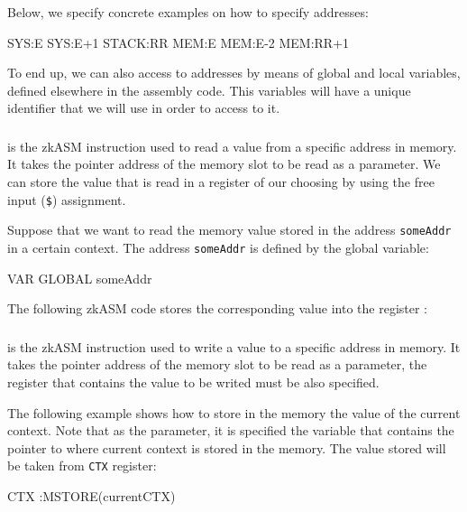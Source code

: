 Below, we specify concrete examples on how to specify addresses:

\begin{zkasm}
SYS:E
SYS:E+1
STACK:RR
MEM:E 
MEM:E-2
MEM:RR+1
\end{zkasm}

To end up, we can also access to addresses by means of global and local variables, defined elsewhere in the assembly code. This variables will have a unique identifier that we will use in order to access to it.


\subsubsection{\MLOAD}


\MLOAD is the zkASM instruction used to read a value from a specific address in memory. It takes the pointer address of the memory slot to be read as a parameter. We can store the value that is read in a register of our choosing by using the free input (\texttt{\$}) assignment. 

Suppose that we want to read the memory value stored in the address \texttt{someAddr} in a certain context. The address \texttt{someAddr} is defined by the global variable:
\begin{zkasm}
VAR GLOBAL someAddr
\end{zkasm}

The following zkASM code stores the corresponding value into the register \A:





\subsubsection{\MSTORE}


\MSTORE is the zkASM instruction used to write a value to a specific address in memory. It takes the pointer address of the memory slot to be read as a parameter, the register that contains the value to be writed must be also specified.

The following example shows how to store in the memory the value of the current context. Note that as the \MSTORE parameter, it is specified the variable that contains the pointer to where current context is stored in the memory. The value stored will be taken from \texttt{CTX} register:
\begin{zkasm}
CTX       :MSTORE(currentCTX)      
\end{zkasm}



